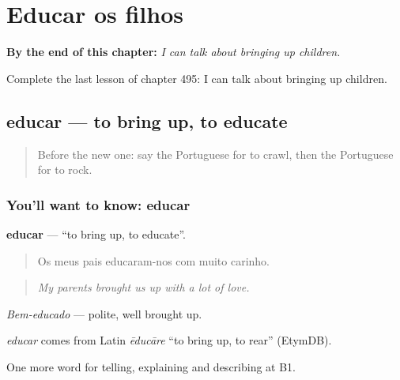 
\chapter{Educar os filhos}
\label{ch:pt-educar-os-filhos}

\begin{chapteropening}
\textbf{By the end of this chapter:} \emph{I can talk about bringing up children.}

Complete the last lesson of chapter 495: I can talk about bringing up children.
\end{chapteropening}

\section[educar]{educar — to bring up, to educate}

\label{lesson:PT-C495-educar}



\begin{quote}
Before the new one: say the Portuguese for to crawl, then the Portuguese for to rock.
\end{quote}

\subsection*{You'll want to know: educar}
\textbf{educar} — \textquotedblleft{}to bring up, to educate\textquotedblright{}.

\begin{quote}
Os meus pais educaram-nos com muito carinho.
\end{quote}

\begin{quote}
\emph{My parents brought us up with a lot of love.}
\end{quote}

\emph{Bem-educado} — polite, well brought up.

\begin{cousinweb}
\emph{educar} comes from Latin \emph{ēducāre} \textquotedblleft{}to bring up, to rear\textquotedblright{} (EtymDB).
\end{cousinweb}

\begin{grammarlens}[title={What you've built}]
One more word for telling, explaining and describing at B1.
\end{grammarlens}

